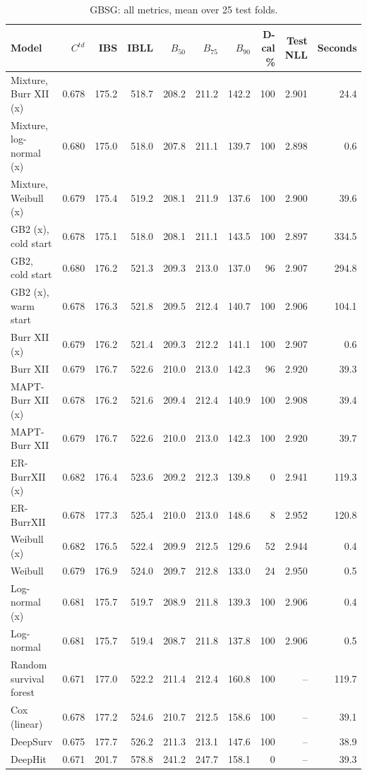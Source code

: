 \begin{table}[htbp]
\centering
\caption{GBSG: all metrics, mean over 25 test folds.}\label{stab:real_gbsg}
\footnotesize
\begin{tabular}{lrrrrrrrrr}
\toprule
Model & $C^{td}$ & IBS & IBLL & $B_{50}$ & $B_{75}$ & $B_{90}$ & D-cal \% & Test NLL & Seconds \\
\midrule
Mixture, Burr XII (x) & 0.678 & 175.2 & 518.7 & 208.2 & 211.2 & 142.2 & 100 & 2.901 & 24.4 \\
Mixture, log-normal (x) & 0.680 & 175.0 & 518.0 & 207.8 & 211.1 & 139.7 & 100 & 2.898 & 0.6 \\
Mixture, Weibull (x) & 0.679 & 175.4 & 519.2 & 208.1 & 211.9 & 137.6 & 100 & 2.900 & 39.6 \\
GB2 (x), cold start & 0.678 & 175.1 & 518.0 & 208.1 & 211.1 & 143.5 & 100 & 2.897 & 334.5 \\
GB2, cold start & 0.680 & 176.2 & 521.3 & 209.3 & 213.0 & 137.0 & 96 & 2.907 & 294.8 \\
GB2 (x), warm start & 0.678 & 176.3 & 521.8 & 209.5 & 212.4 & 140.7 & 100 & 2.906 & 104.1 \\
Burr XII (x) & 0.679 & 176.2 & 521.4 & 209.3 & 212.2 & 141.1 & 100 & 2.907 & 0.6 \\
Burr XII & 0.679 & 176.7 & 522.6 & 210.0 & 213.0 & 142.3 & 96 & 2.920 & 39.3 \\
MAPT-Burr XII (x) & 0.678 & 176.2 & 521.6 & 209.4 & 212.4 & 140.9 & 100 & 2.908 & 39.4 \\
MAPT-Burr XII & 0.679 & 176.7 & 522.6 & 210.0 & 213.0 & 142.3 & 100 & 2.920 & 39.7 \\
ER-BurrXII (x) & 0.682 & 176.4 & 523.6 & 209.2 & 212.3 & 139.8 & 0 & 2.941 & 119.3 \\
ER-BurrXII & 0.678 & 177.3 & 525.4 & 210.0 & 213.0 & 148.6 & 8 & 2.952 & 120.8 \\
Weibull (x) & 0.682 & 176.5 & 522.4 & 209.9 & 212.5 & 129.6 & 52 & 2.944 & 0.4 \\
Weibull & 0.679 & 176.9 & 524.0 & 209.7 & 212.8 & 133.0 & 24 & 2.950 & 0.5 \\
Log-normal (x) & 0.681 & 175.7 & 519.7 & 208.9 & 211.8 & 139.3 & 100 & 2.906 & 0.4 \\
Log-normal & 0.681 & 175.7 & 519.4 & 208.7 & 211.8 & 137.8 & 100 & 2.906 & 0.5 \\
Random survival forest & 0.671 & 177.0 & 522.2 & 211.4 & 212.4 & 160.8 & 100 & -- & 119.7 \\
Cox (linear) & 0.678 & 177.2 & 524.6 & 210.7 & 212.5 & 158.6 & 100 & -- & 39.1 \\
DeepSurv & 0.675 & 177.7 & 526.2 & 211.3 & 213.1 & 147.6 & 100 & -- & 38.9 \\
DeepHit & 0.671 & 201.7 & 578.8 & 241.2 & 247.7 & 158.1 & 0 & -- & 39.3 \\
\bottomrule
\end{tabular}


\end{table}
